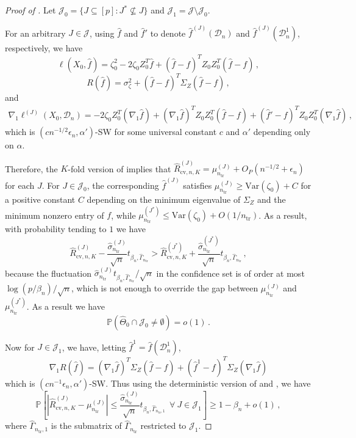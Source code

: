 \documentclass[11pt]{article}
\theoremstyle{plain}
\newcommand{\cv}{{\mathrm{cv}}}
\newcommand{\tr}{{\mathrm{tr}}}
\newcommand{\D}{{\mathcal{D}}}
\newcommand{\var}{\mathrm{Var}}
\begin{document}
\begin{proof}
    [Proof of ]
    Let $\mathcal J_0=\{J\subseteq[p]:J^*\nsubseteq J\}$ and $\mathcal J_1=\mathcal J\setminus \mathcal J_0$.

   For an arbitrary $J\in\mathcal J$, using $\hat f$ and $\hat f'$ to denote $\hat f^{(J)}(\D_n)$ and $\hat f^{(J)}(\D_n^1)$, respectively, we have
    $$\ell(X_0,\hat f)=\zeta_0^2-2\zeta_0 Z_0^T \hat f+(\hat f-f)^T Z_0Z_0^T(\hat f-f)\,,$$
    $$
    R(\hat f) = \sigma_{\zeta}^2 +(\hat f-f)^T \Sigma_Z(\hat f-f)\,,
    $$
    and
    \begin{align*}
        \nabla_1 \ell^{(J)}(X_0,\D_n)= -2\zeta_0 Z_0^T(\nabla_1\hat f)+(\nabla_1 \hat f)^T Z_0Z_0^T(\hat f-f)+(\hat f'-f)^TZ_0Z_0^T(\nabla_1\hat f)\,,
    \end{align*}
    which is $(cn^{-1/2}\epsilon_n,\alpha')$-SW for some universal constant $c$ and $\alpha'$ depending only on $\alpha$.

    Therefore, the $K$-fold version of  implies that $\hat R_{\cv,n,K}^{(J)}=\mu_{n_\tr}^{(J)}+O_P(n^{-1/2}+\epsilon_n)$ for each $J$.
    For $J\in \mathcal J_0$, the corresponding $\hat f^{(J)}$ satisfies
$\mu_{n_\tr}^{(J)}\ge \var(\zeta_0)+ C$ for a positive constant $C$ depending on the minimum eigenvalue of $\Sigma_Z$ and the minimum nonzero entry of $f$, while $\mu_{n_\tr}^{(J^*)}\le \var(\zeta_0)+ O(1/n_\tr)$.
As a result, with probability tending to $1$ we have
\begin{equation}\label{eq:5.2-Rcv-gap-bad}
\hat R_{\cv,n,K}^{(J)}-\frac{\hat\sigma_{n_\tr}^{(J)}}{\sqrt{n}}t_{\beta_n,\hat\Gamma_{n_\tr}}>\hat R_{\cv,n,K}^{(J^*)}+\frac{\hat\sigma_{n_\tr}^{(J^*)}}{\sqrt{n}}t_{\beta_n,\hat\Gamma_{n_\tr}}\,,
\end{equation}
    because the fluctuation $\hat\sigma_{n_\tr}^{(J)} t_{\beta_n,\hat\Gamma_{n_\tr}}/\sqrt{n}$ in the confidence set is of order at most $\log(p/\beta_n)/\sqrt{n}$, which is not enough to override the gap between $\mu_{n_\tr}^{(J)}$ and $\mu_{n_\tr}^{(J^*)}$. As a result we have
    \begin{equation}\label{eq:5.2-exclude}
\mathbb P(\hat\Theta_0\cap \mathcal J_0\neq \emptyset)=o(1)\,.\end{equation}

Now for $J\in \mathcal J_1$, we have, letting $\hat f^1=\hat f(\D_n^1)$,
$$
\nabla_1 R(\hat f)=(\nabla_1 \hat f)^T\Sigma_Z (\hat f-f)+(\hat f^1-f)^T\Sigma_Z(\nabla_1\hat f)
$$
which is $(cn^{-1}\epsilon_n,\alpha')$-SW.  Thus using the deterministic version of  and ,
we have
\begin{equation}\label{eq:5.2-Rcv-gap-good}
\mathbb P\left[\left|\hat R^{(J)}_{\cv,n,K}-\mu^{(J)}_{n_\tr}\right|\le \frac{\hat\sigma^{(J)}_{n_\tr}}{\sqrt{n}}t_{\beta_n,\hat\Gamma_{n_\tr,1}}~~\forall~J\in\mathcal J_1\right]\ge 1-\beta_n+o(1)\,,
\end{equation}
where $\hat\Gamma_{n_\tr,1}$ is the submatrix of $\hat\Gamma_{n_\tr}$ restricted to $\mathcal J_1$.


\end{proof}
\end{document}
